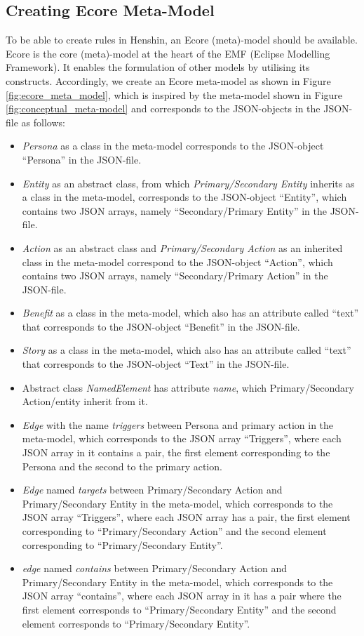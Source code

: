 \subsection*{Creating Ecore Meta-Model}\label{workflow_ecore}
To be able to create rules in Henshin, an Ecore (meta)-model should be available. Ecore is the core (meta)-model at the heart of the EMF (Eclipse Modelling Framework). It enables the formulation of other models by utilising its constructs.
Accordingly, we create an Ecore meta-model as shown in Figure \ref{fig:ecore_meta_model}, which is inspired by the meta-model shown in Figure \ref{fig:conceptual_meta-model} and corresponds to the JSON-objects in the JSON-file as follows:
\begin{itemize}
	\item \textit{Persona} as a class in the meta-model corresponds to the JSON-object \enquote{Persona} in the JSON-file.
	\item \textit{Entity} as an abstract class, from which \textit{Primary/Secondary Entity} inherits as a class in the meta-model, corresponds to the JSON-object \enquote{Entity}, which contains two JSON arrays, namely \enquote{Secondary/Primary Entity} in the JSON-file.
	\item \textit{Action} as an abstract class and \textit{Primary/Secondary Action} as an inherited class in the meta-model correspond to the JSON-object \enquote{Action}, which contains two JSON arrays, namely \enquote{Secondary/Primary Action} in the JSON-file.
	\item \textit{Benefit} as a class in the meta-model, which also has an attribute called \enquote{text} that corresponds to the JSON-object \enquote{Benefit} in the JSON-file.
	\item \textit{Story} as a class in the meta-model, which also has an attribute called \enquote{text} that corresponds to the JSON-object \enquote{Text} in the JSON-file.
	\item Abstract class \textit{NamedElement} has attribute \textit{name}, which Primary/Secondary Action/entity inherit from it.
	\item \textit{Edge} with the name \textit{triggers} between Persona and primary action in the meta-model, which corresponds to the JSON array \enquote{Triggers}, where each JSON array in it contains a pair, the first element corresponding to the Persona and the second to the primary action.
	\item \textit{Edge} named \textit{targets} between Primary/Secondary Action and Primary/Secondary Entity in the meta-model, which corresponds to the JSON array \enquote{Triggers}, where each JSON array has a pair, the first element corresponding to \enquote{Primary/Secondary Action} and the second element corresponding to \enquote{Primary/Secondary Entity}.
	\item \textit{edge} named \textit{contains} between Primary/Secondary Action and Primary/Secondary Entity in the meta-model, which corresponds to the JSON array \enquote{contains}, where each JSON array in it has a pair where the first element corresponds to \enquote{Primary/Secondary Entity} and the second element corresponds to \enquote{Primary/Secondary Entity}.
\end{itemize}

